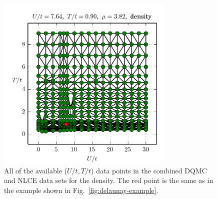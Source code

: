 \begin{figure}
    \centering
\includegraphics[width=0.75\textwidth]{../figures/hubbard-data/dataplots/interp/allpts_141014.png}
\caption{All of the available ($U/t,T/t$) data points in the combined DQMC and
NLCE data sets for the density. The red point is the same as in the example
shown in Fig.~\ref{fig:delaunay-example}. }
\label{fig:delaunay-all}
\end{figure}
 




